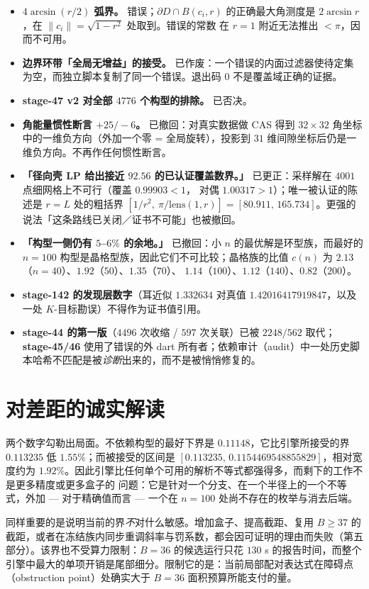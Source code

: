 \begin{itemize}[leftmargin=1.4em,itemsep=3pt]
\item \textbf{$4\arcsin(r/2)$ 弧界。} 错误；$\partial D\cap B(c_i,r)$ 的正确最大角测度是
$2\arcsin r$，在 $\|c_i\|=\sqrt{1-r^2}$ 处取到。错误的常数
在 $r=1$ 附近无法推出 $<\!\pi$，因而不可用。
\item \textbf{边界环带「全局无增益」的接受。} 已作废：一个错误的内面过滤器使待定集为空，而独立脚本复制了同一个错误。退出码 $0$
不是覆盖域正确的证据。
\item \textbf{stage-47 v2 对全部 $4776$ 个构型的排除。} 已否决。
\item \textbf{角能量惯性断言 $+25/-6$。} 已撤回：对真实数据做 CAS 得到 $32\times32$ 角坐标中的一维负方向（外加一个零 = 全局旋转），投影到 $31$ 维间隙坐标后仍是一维负方向。不再作任何惯性断言。
\item \textbf{「径向壳 LP 给出接近 $92.56$ 的已认证覆盖数界。」}
已更正：采样解在 $4001$ 点细网格上不可行（覆盖 $0.99903<1$，
对偶 $1.00317>1$）；唯一被认证的陈述是 $r=L$ 处的粗括界
$[1/r^2,\ \pi/\mathrm{lens}(1,r)]=[80.911,\,165.734]$。更强的说法「这条路线已关闭／证书不可能」也被撤回。
\item \textbf{「构型一侧仍有 $5$--$6\%$ 的余地。」} 已撤回：小 $n$ 的最优解是环型族，而最好的 $n=100$ 构型是晶格型族，因此它们不可比较；晶格族的比值 $c(n)$ 为 $2.13$（$n=40$）、$1.92$（$50$）、$1.35$（$70$）、
$1.14$（$100$）、$1.12$（$140$）、$0.82$（$200$）。
\item \textbf{stage-142 的发现层数字}（耳近似 $1.332634$ 对真值
$1.42016417919847$，以及一处 $K$-目标勘误）不得作为证书值引用。
\item \textbf{stage-44 的第一版}（$4496$ 次收缩 / $597$ 次关联）已被
$2248/562$ 取代；\textbf{stage-45/46} 使用了错误的外 dart 所有者；依赖审计（audit）中一处历史脚本哈希不匹配是被\emph{诊断}出来的，而不是被悄悄修复的。
\end{itemize}

\section{对差距的诚实解读}

两个数字勾勒出局面。不依赖构型的最好下界是 $0.11148$，它比引擎所接受的界 $0.113235$ 低
$1.55\%$；而被接受的区间是
$[0.113235,\,0.1154469548855829]$，相对宽度约为 $1.92\%$。因此引擎比任何单个可用的解析不等式都强得多，而剩下的工作不是更多精度或更多盒子的
问题：它是针对一个分支、在一个半径上的一个不等式，外加 --- 对于精确值而言 --- 一个在 $n=100$ 处尚不存在的枚举与消去后端。

同样重要的是说明当前的界\emph{不}对什么敏感。增加盒子、提高截距、复用 $B\ge37$ 的截距，或者在冻结族内同步重调斜率与罚系数，都会因可证明的理由而失败（第五部分）。该界也不受算力限制：$B=36$ 的候选运行只花 $130$ s 的报告时间，而整个引擎中最大的单项开销是尾部细分。限制它的是：当前局部配对表达式在障碍点（obstruction point）处确实大于 $B=36$ 面积预算所能支付的量。

